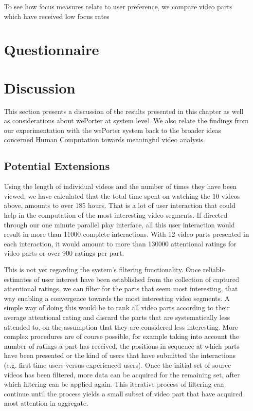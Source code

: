 To see how focus measures relate to user preference, we compare video parts which have received low focus rates




\section{Questionnaire} %
\label{sec:questionnaire}


\section{Discussion} %
\label{sec:discussion}

This section presents a discussion of the results presented in this chapter as well as considerations about wePorter at system level. We also relate the findings from our experimentation with the wePorter system back to the broader ideas concerned Human Computation towards meaningful video analysis.

\subsection{Potential Extensions} %
\label{sub:potential_in_real_context}
Using the length of individual videos and the number of times they have been viewed, we have calculated that the total time spent on watching the 10 videos above, amounts to over 185 hours. That is a lot of user interaction that could help in the computation of the most interesting video segments. If directed through our one minute parallel play interface, all this user interaction would result in more than 11000 complete interactions. With 12 video parts presented in each interaction, it would amount to more than 130000 attentional ratings for video parts or over 900 ratings per part. 

This is not yet regarding the system's filtering functionality. Once reliable estimates of user interest have been established from the collection of captured attentional ratings, we can filter for the parts that seem most interesting, that way enabling a convergence towards the most interesting video segments. A simple way of doing this would be to rank all video parts according to their average attentional rating and discard the parts that are systematically less attended to, on the assumption that they are considered less interesting. More complex procedures are of course possible, for example taking into account the number of ratings a part has received, the positions in sequence at which parts have been presented or the kind of users that have submitted the interactions (e.g. first time users versus experienced users). Once the initial set of source videos has been filtered, more data can be acquired for the remaining set, after which filtering can be applied again. This iterative process of filtering can continue until the process yields a small subset of video part that have acquired most attention in aggregate.

